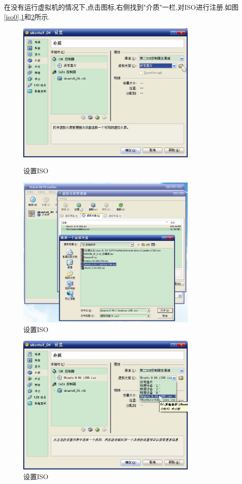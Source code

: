 \documentclass[12pt,a4paper,titlepage]{article}
\begin{document}
在没有运行虚拟机的情况下,点击图标,右侧找到"介质"一栏,对ISO进行注册.如图\ref{iso0},\ref{iso1}和\ref{iso2}所示.
\begin{figure}[!bthp]
\centering
\includegraphics[width=0.8\textwidth,scale=0.8]{pic/f_vb_setting_iso.eps}
\caption{设置ISO\label{iso0}}
\includegraphics[width=0.8\textwidth,scale=0.8]{pic/f_vb_setting_iso_register.eps}
\caption{设置ISO\label{iso1}}
\end{figure}
\begin{figure}[!bthp]
\centering
\includegraphics[width=0.8\textwidth,scale=0.8]{pic/f_vb_setting_iso_set.eps}
\caption{设置ISO\label{iso2}}
\end{figure}
\end{document}
